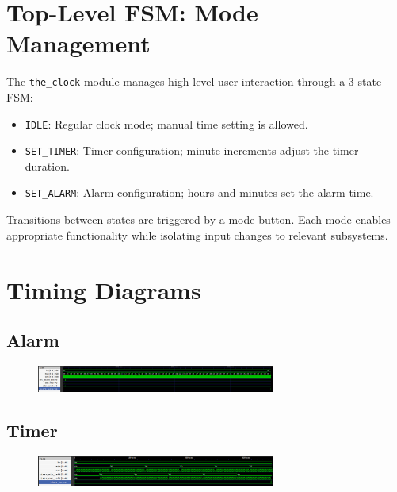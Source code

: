 \documentclass[11pt]{article}
\begin{document}
\section{Top-Level FSM: Mode Management}
The \texttt{the\_clock} module manages high-level user interaction through a 3-state FSM:
\begin{itemize}
  \item \texttt{IDLE}: Regular clock mode; manual time setting is allowed.
  \item \texttt{SET\_TIMER}: Timer configuration; minute increments adjust the timer duration.
  \item \texttt{SET\_ALARM}: Alarm configuration; hours and minutes set the alarm time.
\end{itemize}
\begin{figure}[H]
\centering
{}%

\end{figure}
Transitions between states are triggered by a mode button. Each mode enables appropriate functionality while isolating input changes to relevant subsystems.
\section{Timing Diagrams}
\subsection{Alarm}
\begin{figure}[H]
    \centering
    \includegraphics[width=0.7\textwidth]{figs/alarmtest.png}
\end{figure}
\subsection{Timer}
\begin{figure}[H]
    \centering
    \includegraphics[width=0.7\textwidth]{figs/timertest.png}
\end{figure}
\end{document}
